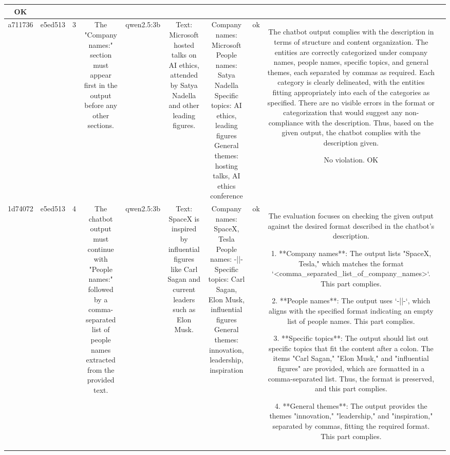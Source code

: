 \begin{table}[h!]
\begin{tabular}{|c|c|c|c|c|c|c|c|c|c|}
OK & \\
\hline
a711736 & e5ed513 & 3 & The "Company names:" section must appear first in the output before any other sections. & qwen2.5:3b & Text: Microsoft hosted talks on AI ethics, attended by Satya Nadella and other leading figures. & Company names: Microsoft
People names: Satya Nadella
Specific topics: AI ethics, leading figures
General themes: hosting talks, AI ethics conference & ok & The chatbot output complies with the description in terms of structure and content organization. The entities are correctly categorized under company names, people names, specific topics, and general themes, each separated by commas as required. Each category is clearly delineated, with the entities fitting appropriately into each of the categories as specified. There are no visible errors in the format or categorization that would suggest any non-compliance with the description. Thus, based on the given output, the chatbot complies with the description given.

No violation.
OK & \\
\hline
1d74072 & e5ed513 & 4 & The chatbot output must continue with "People names:" followed by a comma-separated list of people names extracted from the provided text. & qwen2.5:3b & Text: SpaceX is inspired by influential figures like Carl Sagan and current leaders such as Elon Musk. & Company names: SpaceX, Tesla
People names: -||-
Specific topics: Carl Sagan, Elon Musk, influential figures
General themes: innovation, leadership, inspiration & ok & The evaluation focuses on checking the given output against the desired format described in the chatbot's description. 

1. **Company names**: The output lists "SpaceX, Tesla," which matches the format `<comma_separated_list_of_company_names>`. This part complies.

2. **People names**: The output uses `-||-`, which aligns with the specified format indicating an empty list of people names. This part complies.

3. **Specific topics**: The output should list out specific topics that fit the content after a colon. The items "Carl Sagan," "Elon Musk," and "influential figures" are provided, which are formatted in a comma-separated list. Thus, the format is preserved, and this part complies.

4. **General themes**: The output provides the themes "innovation," "leadership," and "inspiration," separated by commas, fitting the required format. This part complies.


\end{tabular}
\end{table}
